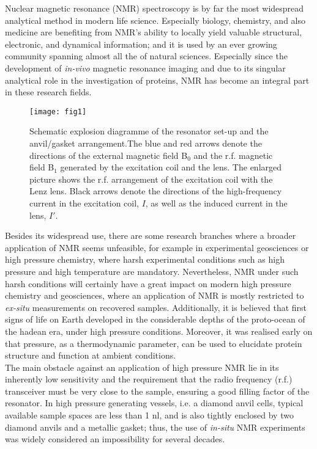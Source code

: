 \documentclass[aip,rsi,reprint,graphicx]{revtex4-1} %
\begin{document}
Nuclear magnetic resonance (NMR) spectroscopy is by far the most widespread analytical method in modern life science. Especially biology, chemistry, and also medicine are benefiting from NMR's ability to locally yield valuable structural, electronic, and dynamical information; and it is used by an ever growing community spanning almost all the of natural sciences\cite{Grant2007, Ernst2010, Andrew1984}. Especially since the development of \textit{in-vivo} magnetic resonance imaging\cite{Lauterbur1973, Mansfield2004} and due to its singular analytical role in the investigation of proteins\cite{Riek1996, Zahn2000, Scheidt2011}, NMR has become an integral part in these research fields.\\
 \begin{figure}[htbp]
 \centering
 \texttt{[image: fig1]}%
 \caption{Schematic explosion diagramme of the resonator set-up and the anvil/gasket arrangement.The blue and red arrows denote the directions of the external magnetic field B$_0$ and the r.f. magnetic field B$_1$ generated by the excitation coil and the lens. The enlarged picture shows the r.f. arrangement of the excitation coil with the Lenz lens. Black arrows denote the directions of the high-frequency current in the excitation coil, $I$, as well as the induced current in the lens, $I'$.\label{fig1}}
 \end{figure}
Besides its widespread use, there are some research branches where a broader application of NMR seems unfeasible, for example in experimental geosciences or high pressure chemistry, where harsh experimental conditions such as high pressure and high temperature are mandatory. Nevertheless, NMR under such harsh conditions will certainly have a great impact on modern high pressure chemistry and geosciences, where an application of NMR is mostly restricted to \textit{ex-situ} measurements on recovered samples\cite{Yarger1995a, Stebbins1995}. Additionally, it is believed that first signs of life on Earth developed in the considerable depths of the proto-ocean of the hadean era, under high pressure conditions\cite{Sharma2002, Daniel2006, Huang2016}. Moreover, it was realised early on that pressure, as a thermodynamic parameter, can be used to elucidate protein structure and function at ambient conditions\cite{Bridgman1914, Balny2006, Heremans1998, Silva2001, Mozhaev1996, Royer2002, Golub2017}.\\
The main obstacle against an application of high pressure NMR lie in its inherently low sensitivity and the requirement that the radio frequency (r.f.) transceiver must be very close to the sample, ensuring a good filling factor of the resonator\cite{Fukushima1994}. In high pressure generating vessels, i.e. a diamond anvil cells, typical available sample spaces are less than 1 nl, and is also tightly enclosed by two diamond anvils and a metallic gasket; thus, the use of \textit{in-situ} NMR experiments was widely considered an impossibility for several decades. \\
\end{document}
